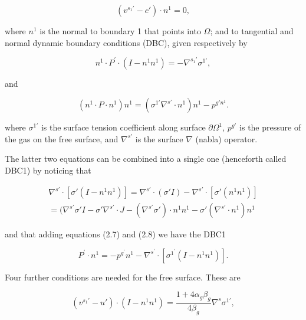 \documentclass{article}
\begin{document}
\begin{equation}
(v^{s_1'} - c') \cdot n^1 = 0, \tag{2.6}
\end{equation}

where \(n^1\) is the normal to boundary 1 that points into \(\Omega\); and to tangential and normal dynamic boundary conditions (DBC), given respectively by

\begin{equation}
n^1\cdot P^{\prime}\cdot (I - n^1 n^1) = -\nabla^{s_1'}\sigma^{1'}, \tag{2.7}
\end{equation}

and

\begin{equation}
\left(n^1\cdot P\cdot n^1\right)n^1 = \left(\sigma^{1'}\nabla^{s'}\cdot n^1\right)n^1 -p^{g'n^1}. \tag{2.8}
\end{equation}

where \(\sigma^{1'}\) is the surface tension coefficient along surface \(\partial \Omega^1\), \(p^{g'}\) is the pressure of the gas on the free surface, and \(\nabla^{s'}\) is the surface \(\nabla\) (nabla) operator.

The latter two equations can be combined into a single one (henceforth called DBC1) by noticing that

\begin{equation}
\begin{array}{r}\nabla^{s'}\cdot \left[\sigma '(I - n^1 n^1)\right] = \nabla^{s'}\cdot (\sigma 'I) - \nabla^{s'}\cdot \left[\sigma '(n^1 n^1)\right]\\ = (\nabla^{s'}\sigma 'I - \sigma '\nabla^{s'}\cdot J - (\nabla^{s'}\sigma ')\cdot n^1 n^1 - \sigma '(\nabla^{s'}\cdot n^1)n^1 \end{array} \tag{2.9}
\end{equation}

and that adding equations (2.7) and (2.8) we have the DBC1

\begin{equation}
P^{\prime}\cdot n^{1} = -p^{g^{\prime}}n^{1} - \nabla^{s^{\prime}}\cdot \left[\sigma^{1^{\prime}}(I - n^{1}n^{1})\right]. \tag{2.10}
\end{equation}

Four further conditions are needed for the free surface. These are

\begin{equation}
(v^{s_1'} - u') \cdot (I - n^1 n^1) = \frac{1 + 4\alpha_g\beta_g}{4\beta_g}\nabla^s\sigma^{1'}, \tag{2.11}
\end{equation}
\end{document}
